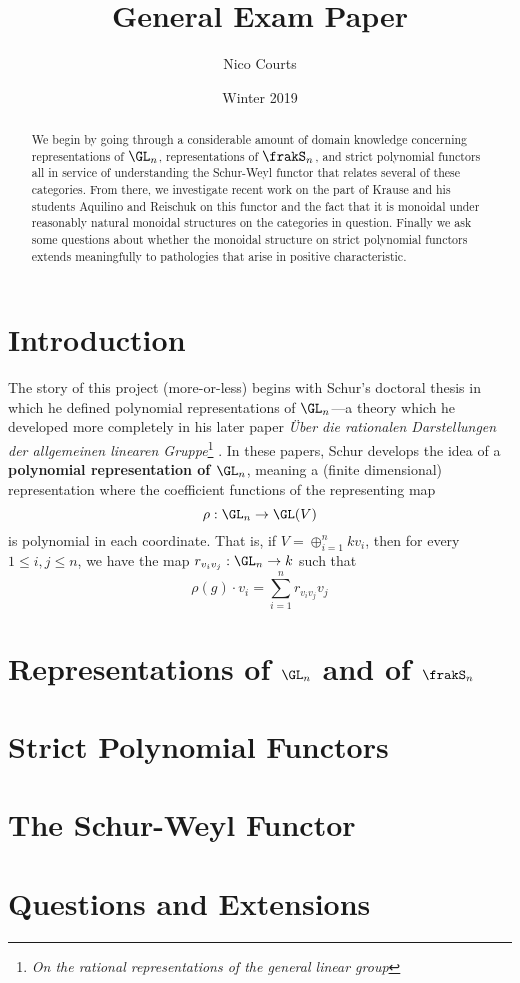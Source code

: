 \documentclass[12pt]{article}
\begin{document}
\title{General Exam Paper \vspace{-1ex}}
\author{Nico Courts}
\date{Winter 2019}
\maketitle

\begin{abstract}
	We begin by going through a considerable amount of domain knowledge concerning representations of $\GL_n$,
	representations of $\frakS_n$, and strict polynomial functors all in service of understanding the Schur-Weyl 
	functor that relates several of these categories. From there, we investigate recent work on the part of Krause 
	and his students Aquilino and Reischuk on this functor and the fact that it is monoidal under reasonably natural monoidal structures on 
	the categories in question. Finally we ask some questions about whether the monoidal structure on strict polynomial functors 
	extends meaningfully to pathologies that arise in positive characteristic.
\end{abstract}

\tableofcontents

\newpage
\section{Introduction}
The story of this project (more-or-less) begins with Schur's doctoral thesis \cite{schur-thesis} in which he defined
polynomial representations of $\GL_n$---a theory which he developed more completely in his later paper \textit{\"Uber die 
rationalen Darstellungen der allgemeinen linearen Gruppe}\footnote{\textit{On the rational representations of the general linear group}}
\cite{schur-rational}. In these papers, Schur develops the idea of a \textbf{polynomial representation of $\GL_n$},
meaning a (finite dimensional) representation where the coefficient functions of the representing map 
\[\rho:\GL_n\to \GL(V)\]
is polynomial in each coordinate. That is, if $V=\oplus_{i=1}^n kv_i$, then for every $1\le i,j\le n$, we have the map
$r_{v_iv_j}:\GL_n\to k$ such that 
\[\rho(g)\cdot v_i=\sum_{i=1}^n r_{v_iv_j}v_j\]

\section{Representations of \texorpdfstring{$\GL_n$}{GLn} and of \texorpdfstring{$\frakS_n$}{Sn}}

\section{Strict Polynomial Functors}

\section{The Schur-Weyl Functor}

\section{Questions and Extensions}


\medskip

\printbibliography
\end{document}
